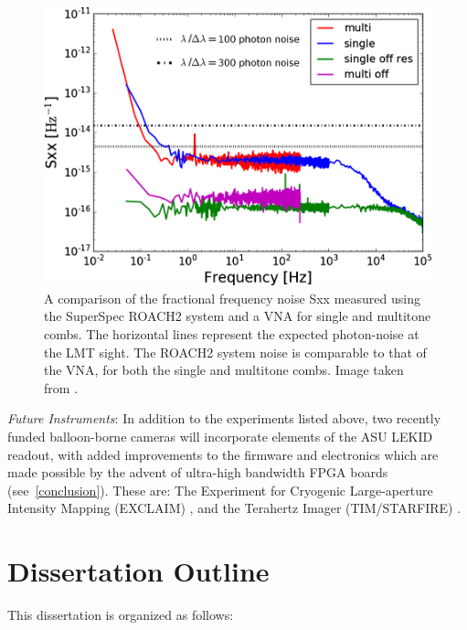 {\begin{figure}[!htbp]
\centering
\includegraphics[width=\textwidth]{figures/intro/superspec_noisecomp}
\caption[~Comparison of the fractional frequency noise measured using the SuperSpec ROACH2 system and a VNA for single and multitone combs.]{A comparison of the fractional frequency noise \gls{Sxx} measured using the SuperSpec ROACH2 system and a VNA for single and multitone combs. The horizontal lines represent the expected photon-noise at the LMT sight. The ROACH2 system noise is comparable to that of the VNA, for both the single and multitone combs. Image taken from \citet{mcgeehan2018low}.}
\label{fig:readout noise comp}
\end{figure}

\vspace{5mm}

\textit{Future Instruments}: In addition to the experiments listed above, two recently funded balloon-borne cameras will incorporate elements of the ASU LEKID readout, with added improvements to the firmware and electronics which are made possible by the advent of ultra-high bandwidth FPGA boards (see~\ref{conclusion}). These are: The Experiment for Cryogenic Large-aperture Intensity Mapping (EXCLAIM) \citep{switzer2017measuring}, and the Terahertz Imager (TIM/STARFIRE) \citep{aguirre2018starfire}.

\section{Dissertation Outline}

This dissertation is organized as follows:

}
